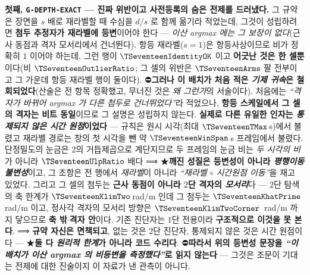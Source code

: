 \documentclass[11pt]{report}
\numberwithin{equation}{chapter}
\numberwithin{figure}{chapter}
\numberwithin{table}{chapter}
\begin{document}
\textbf{첫째, \texttt{G-DEPTH-EXACT} --- 진짜 위반이고 사전등록의 숨은 전제를 드러냈다.}
그 규약은 장면을 $s$ 배로 재라벨할 때 수심을 $d/s$ 로 함께 옮기라 적었는데, 그것이
성립하려면 \textbf{첨두 추정자가 재라벨에 등변}이어야 한다 --- \emph{이산 argmax 에는 그
보장이 없다}(근사 동점과 격자 모서리에서 건너뛴다). 항등 재라벨($s = 1$)은 항등사상이므로
비가 정확히 $1$ 이어야 하는데, 그런 행이 $\TSeventeenIdentityOK$ 이고 \textbf{어긋난 것은
한 셀뿐}이다(비 $\TSeventeenOutlierRatio$; 그 셀의 위반은 $\TSeventeenArms$ 팔 전부이고
그 가운데 항등 재라벨 행이 둘이다).
⛔\textbf{그러나 이 배치가 처음 적은 \emph{기제 귀속}은 철회되었다}(산술은 전 항목
정확했고, 무너진 것은 \emph{왜 그런가}의 서술이다). 처음에는 \emph{``격자가 바뀌어 argmax
가 다른 첨두로 건너뛰었다''}라 적었으나, \textbf{항등 스케일에서 그 셀의 격자는 비트
동일}이므로 그 설명은 성립하지 않는다. \textbf{실제로 다른 유일한 인자는 \emph{통제되지
않은 시간 원점}이었다} --- 규칙은 원시 시각(최대 $\TSeventeenTMax$\,s)에서 불렸고 재라벨
경로는 창의 첫 시각을 뺀 약 $\TSeventeenWinSpan$\,s 프레임에서 불렸다. 단정밀도의 눈금은
$2$의 거듭제곱으로 계단지므로 두 프레임의 눈금 비는 \emph{두 시각의 비}가 아니라
$\TSeventeenUlpRatio$ 배다 ⟹ ★\textbf{깨진 성질은 등변성이 아니라 \emph{평행이동
불변성}}이고, 그 조항은 전 행에서 \emph{재라벨}이 아니라 \emph{``재라벨 $\circ$ 시간원점
이동''}을 재고 있었다. 그리고 그 셀의 첨두는 \textbf{근사 동점이 아니라 $2$단 격자의
\emph{모서리}}다 --- $2$단 탐색의 축 한계가 $\TSeventeenKlimTwo$\,rad/m 인데 그 첨두는
$\TSeventeenKhatPrime$\,rad/m 이고, 정사각 격자의 모서리 방향은 $\TSeventeenKlimTwoCorner$
\,rad/m 까지 닿으므로 \textbf{축 밖$\cdot$격자 안}이다. 기존 진단자는 $1$단 전용이라
\textbf{구조적으로 이것을 못 본다}. ⟹ \textbf{규약 자신은 면책되고}, 없는 것은 $2$단
진단자, 통제되지 않은 것은 시간 원점이다 --- ★\textbf{둘 다 \emph{원리적 한계}가 아니라
코드 수리다}. ⛔\textbf{따라서 위의 등변성 문장을 \emph{``이 배치가 이산 argmax 의 비등변을
측정했다''}로 읽지 않는다} --- 그것은 조문이 기대는 전제에 대한 진술이지 이 자료가 낸
관측이 아니다.
\end{document}
